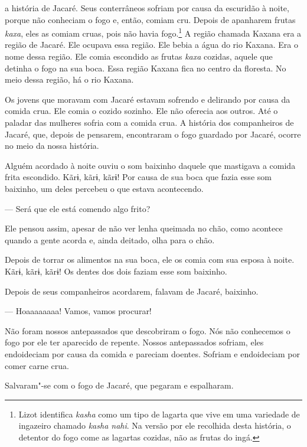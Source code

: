 
 a história de Jacaré. Seus conterrâneos sofriam por causa
da escuridão à noite, porque não conheciam o fogo e, então, comiam cru.
Depois de apanharem frutas \emph{kaxa}, eles as comiam cruas, pois não
havia fogo.\footnote{ Lizot identifica \emph{kasha} como um tipo de lagarta que vive em uma variedade de ingazeiro chamado \emph{kasha nahi}. Na versão por ele recolhida desta história, o detentor do fogo come as lagartas cozidas, não as frutas do ingá.} A região chamada Kaxana era a região de Jacaré. Ele ocupava
essa região. Ele bebia a água do rio Kaxana. Era o nome dessa região.
Ele comia escondido as frutas \emph{kaxa} cozidas, aquele que
detinha o fogo na sua boca. Essa região Kaxana fica no centro da
floresta. No meio dessa região, há o rio Kaxana. 

Os jovens que moravam com Jacaré estavam sofrendo e delirando por causa
da comida crua. Ele comia o cozido sozinho. Ele não oferecia aos outros. Até o
paladar das mulheres sofria com a comida crua. A história dos
companheiros de Jacaré, que, depois de pensarem, encontraram o fogo
guardado por Jacaré, ocorre no meio da nossa história. 

Alguém acordado à noite ouviu o som baixinho daquele que mastigava
a comida frita escondido. Kãrɨ, kãrɨ, kãrɨ! Por causa de sua boca
que fazia esse som baixinho, um deles percebeu o que estava acontecendo. 

--- Será que ele está comendo algo frito?

Ele pensou assim, apesar de não ver lenha queimada no chão, como
acontece quando a gente acorda e, ainda deitado, olha para o chão. 

Depois de torrar os alimentos na sua boca, ele os comia com sua esposa à
noite. Kãrɨ, kãrɨ, kãrɨ! Os dentes dos dois faziam esse som
baixinho. 

Depois de seus companheiros acordarem, falavam de Jacaré, baixinho. 

--- Hoaaaaaaaa! Vamos, vamos procurar! 

Não foram nossos antepassados que descobriram o fogo. Nós não conhecemos
o fogo por ele ter aparecido de repente. Nossos antepassados sofriam,
eles endoideciam por causa da comida e pareciam doentes. Sofriam e
endoideciam por comer carne crua. 

Salvaram"-se com o fogo de Jacaré, que pegaram e espalharam. 

